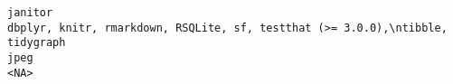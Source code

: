 \documentclass[
  letterpaper,
  DIV=11,
  numbers=noendperiod]{scrreprt}
\begin{document}
\begin{verbatim}
janitor                                                                                                                                                                                                                                                                                                                                                                                                                                                                                                                                                                                                                                                                                                                                                                                                                                                                                                                                                                                                                                                                                                                                                                                                                        dbplyr, knitr, rmarkdown, RSQLite, sf, testthat (>= 3.0.0),\ntibble, tidygraph
jpeg                                                                                                                                                                                                                                                                                                                                                                                                                                                                                                                                                                                                                                                                                                                                                                                                                                                                                                                                                                                                                                                                                                                                                                                                                                                                                                     <NA>

\end{verbatim}
\end{document}
